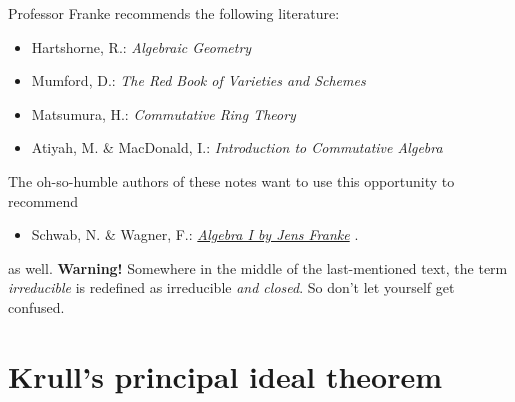 \documentclass[a4paper,parskip=half,numbers=enddot, DIV=12]{scrreprt}
\begin{document}
Professor Franke recommends the following literature:
\begin{itemize}
	\item Hartshorne, R.: \emph{Algebraic Geometry}
	\item Mumford, D.: \emph{The Red Book of Varieties and Schemes}
	\item Matsumura, H.: \emph{Commutative Ring Theory}
	\item Atiyah, M. \& MacDonald, I.: \emph{Introduction to Commutative Algebra} \cite{matsumuraCRT}
\end{itemize}
The oh-so-humble authors of these notes want to use this opportunity to recommend
\begin{itemize}
	\item Schwab, N. \& Wagner, F.:  \href{https://github.com/Nicholas42/AlgebraFranke/tree/master/AlgebraI}{\emph{Algebra I by Jens Franke}} \cite{alg1}.
\end{itemize}
as well. \textbf{Warning!} Somewhere in the middle of the last-mentioned text, the term \emph{irreducible} is redefined as irreducible \emph{and closed}. So don't let yourself get confused. 

\chapter{Krull's principal ideal theorem}
\end{document}
